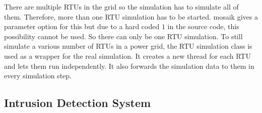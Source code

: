 \documentclass[conference]{IEEEtran}
\begin{document}
		There are multiple RTUs in the grid so the simulation has to simulate all of them. Therefore, more than one RTU simulation has to be started. mosaik gives a parameter option for this but due to a hard coded $1$ in the source code, this possibility cannot be used. So there can only be one RTU simulation. To still simulate a various number of RTUs in a power grid, the RTU simulation class is used as a wrapper for the real simulation. It creates a new thread for each RTU and lets them run independently. It also forwards the simulation data to them in every simulation step.
		
	\subsection{Intrusion Detection System}
		
\end{document}
